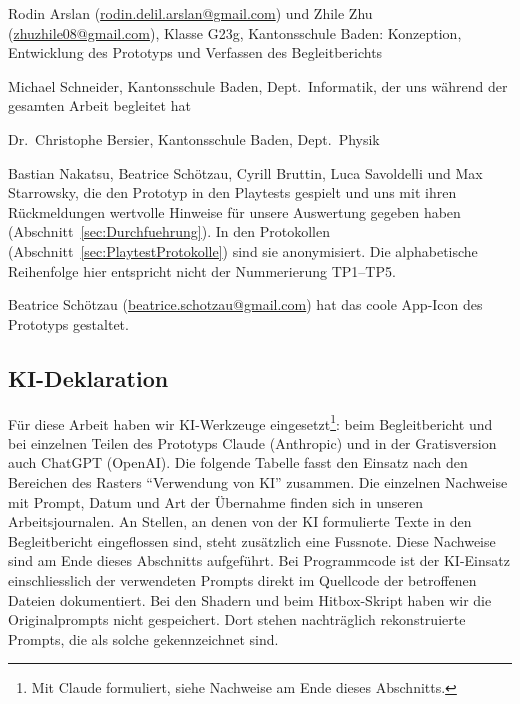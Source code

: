 \documentclass[../Main.tex]{subfiles}
\begin{document}
\begin{description}[leftmargin=1.5cm, style=nextline, itemsep=0.6em]
    \item[Projektteam] Rodin Arslan (\url{rodin.delil.arslan@gmail.com}) und Zhile Zhu (\url{zhuzhile08@gmail.com}), Klasse G23g, Kantonsschule Baden: Konzeption, Entwicklung des Prototyps und Verfassen des Begleitberichts
    \item[Erstbetreuung] Michael Schneider, Kantonsschule Baden, Dept.\ Informatik, der uns während der gesamten Arbeit begleitet hat
    \item[Zweitbewerter] Dr.\ Christophe Bersier, Kantonsschule Baden, Dept.\ Physik
    \item[Testpersonen] Bastian Nakatsu, Beatrice Schötzau, Cyrill Bruttin, Luca Savoldelli und Max Starrowsky, die den Prototyp in den Playtests gespielt und uns mit ihren Rückmeldungen wertvolle Hinweise für unsere Auswertung gegeben haben (Abschnitt~\ref{sec:Durchfuehrung}). In den Protokollen (Abschnitt~\ref{sec:PlaytestProtokolle}) sind sie anonymisiert. Die alphabetische Reihenfolge hier entspricht nicht der Nummerierung TP1--TP5.
    \item[Weitere Unterstützung] Beatrice Schötzau (\url{beatrice.schotzau@gmail.com}) hat das coole App-Icon des Prototyps gestaltet.
\end{description}

\subsection{KI-Deklaration} \label{sec:KIDeklaration}

Für diese Arbeit haben wir KI-Werkzeuge eingesetzt\footnote{Mit Claude formuliert, siehe Nachweise am Ende dieses Abschnitts.}: beim Begleitbericht und bei einzelnen Teilen des Prototyps Claude (Anthropic) und in der Gratisversion auch ChatGPT (OpenAI). Die folgende Tabelle fasst den Einsatz nach den Bereichen des Rasters \enquote{Verwendung von KI} zusammen. Die einzelnen Nachweise mit Prompt, Datum und Art der Übernahme finden sich in unseren Arbeitsjournalen. An Stellen, an denen von der KI formulierte Texte in den Begleitbericht eingeflossen sind, steht zusätzlich eine Fussnote. Diese Nachweise sind am Ende dieses Abschnitts aufgeführt. Bei Programmcode ist der KI-Einsatz einschliesslich der verwendeten Prompts direkt im Quellcode der betroffenen Dateien dokumentiert. Bei den Shadern und beim Hitbox-Skript haben wir die Originalprompts nicht gespeichert. Dort stehen nachträglich rekonstruierte Prompts, die als solche gekennzeichnet sind.
\end{document}
